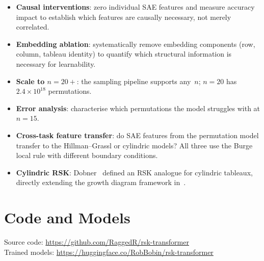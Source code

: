 \documentclass[11pt,a4paper]{article}
\begin{document}
\begin{itemize}[nosep]
    \item \textbf{Causal interventions}: zero individual SAE features and measure accuracy impact to establish which features are causally necessary, not merely correlated.
    \item \textbf{Embedding ablation}: systematically remove embedding components (row, column, tableau identity) to quantify which structural information is necessary for learnability.
    \item \textbf{Scale to $n{=}20{+}$}: the sampling pipeline supports any~$n$; $n{=}20$ has $2.4 \times 10^{18}$ permutations.
    \item \textbf{Error analysis}: characterise which permutations the model struggles with at $n{=}15$.
    \item \textbf{Cross-task feature transfer}: do SAE features from the permutation model transfer to the Hillman--Grassl or cylindric models? All three use the Burge local rule with different boundary conditions.
    \item \textbf{Cylindric RSK}: Dobner~\cite{dobner2026} defined an RSK analogue for cylindric tableaux, directly extending the growth diagram framework in~\cite{langer2013}.
\end{itemize}

\section*{Code and Models}

Source code: \url{https://github.com/RaggedR/rsk-transformer}\\
Trained models: \url{https://huggingface.co/RobBobin/rsk-transformer}
\end{document}

